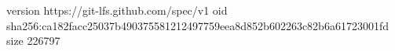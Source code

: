 version https://git-lfs.github.com/spec/v1
oid sha256:ca182facc25037b490375581212497759eea8d852b602263c82b6a61723001fd
size 226797
